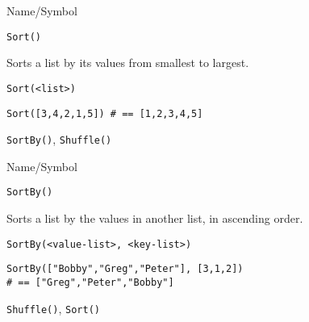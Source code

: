 \rl


\begin{desc}{Name/Symbol}
\item[Name/Symbol] 	\verb+Sort()+

\item[Description] 	Sorts a list by its values from smallest to largest.

\item[Usage]       	
\begin{verbatim}
Sort(<list>)
\end{verbatim}

\item[Example]
\begin{verbatim}
Sort([3,4,2,1,5]) # == [1,2,3,4,5]
\end{verbatim}

\item[See Also]    	\verb+SortBy()+, \verb+Shuffle()+
\end{desc}

\rl


\begin{desc}{Name/Symbol}
\item[Name/Symbol] 	\verb+SortBy()+

\item[Description] 	Sorts a list by the values in another list, in ascending
		order.

\item[Usage]
\begin{verbatim}
SortBy(<value-list>, <key-list>)
\end{verbatim}

\item[Example]
\begin{verbatim}
SortBy(["Bobby","Greg","Peter"], [3,1,2]) 
# == ["Greg","Peter","Bobby"]
\end{verbatim}

\item[See Also]    	\verb+Shuffle()+, \verb+Sort()+
\end{desc}

\rl


